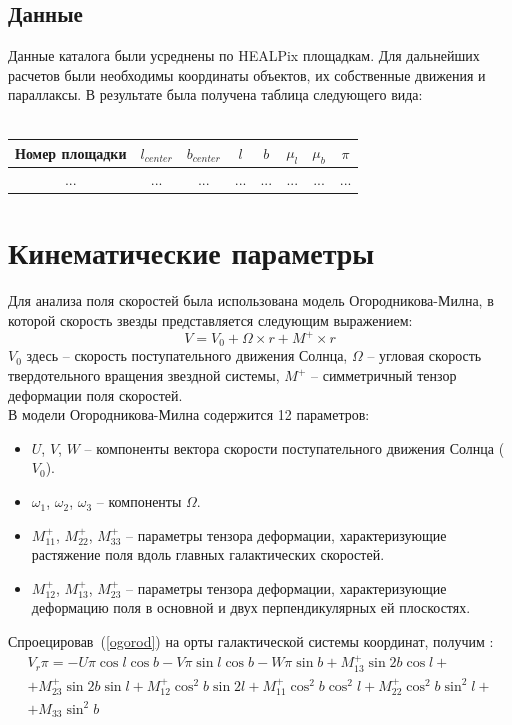 \documentclass[14pt]{article} %
\begin{document}
\subsection{Данные}
Данные каталога были усреднены по HEALPix площадкам. Для дальнейших расчетов были необходимы координаты объектов, их собственные движения и параллаксы. В результате была получена таблица следующего вида:\\\\
\begin{tabular}{|c|c|c|c|c|c|c|c|}
\hline
Номер площадки&$l_{center}$&$b_{center}$&$l$&$b$&$\mu_{l}$&$\mu_{b}$&$\pi$\\
\hline
...&...&...&...&...&...&...&...\\
\hline
\end{tabular}

\section{Кинематические параметры}
Для анализа поля скоростей была использована модель Огородникова-Милна, в которой скорость звезды представляется следующим выражением:
\begin{equation}\label{ogorod}
V=V_0+\Omega\times r+M^+\times r
\end{equation}
$V_0$ здесь -- скорость поступательного движения Солнца, $\Omega$ -- угловая скорость твердотельного вращения звездной системы, $M^+$ -- симметричный тензор деформации поля скоростей.\\
В модели Огородникова-Милна содержится 12 параметров:\\
\begin{itemize}
\item $U$, $V$, $W$ -- компоненты вектора скорости поступательного движения Солнца ($V_0$).
\item $\omega_1$, $\omega_2$, $\omega_3$ -- компоненты $\Omega$.
\item $M^+_{11}$, $M^+_{22}$, $M^+_{33}$ -- параметры тензора деформации, характеризующие растяжение поля вдоль главных галактических скоростей.
\item $M^+_{12}$, $M^+_{13}$, $M^+_{23}$ -- параметры тензора деформации, характеризующие деформацию поля в основной и двух перпендикулярных ей плоскостях.\\
\end{itemize}
Спроецировав~(\ref{ogorod}) на орты галактической системы координат, получим \citep*{ogorod}:
\begin{multline}\label{radial}
V_r\pi=-U\pi\cos l\cos b -V\pi\sin l\cos b-W\pi\sin b+M_{13}^+\sin2b\cos l+\\+M_{23}^+\sin2b\sin l+M_{12}^+\cos^2b\sin2l+M_{11}^+\cos^2b\cos^2l+M_{22}^+\cos^2b\sin^2l+\\+M_{33}\sin^2b
\end{multline}
\end{document}
